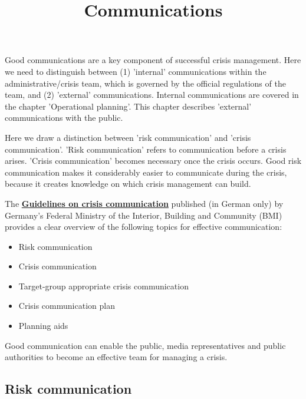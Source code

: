 \documentclass{article}
\begin{document}
\title{Communications}

\maketitle


Good communications are a key component of successful crisis management. Here we need to distinguish between (1) 'internal' communications within the administrative/crisis team, which is governed by the official regulations of the team, and (2) 'external' communications. Internal communications are covered in the chapter 'Operational planning'. This chapter describes 'external' communications with the public.


Here we draw a distinction between 'risk communication' and 'crisis communication'. 'Risk communication' refers to communication before a crisis arises. 'Crisis communication' becomes necessary once the crisis occurs. Good risk communication makes it considerably easier to communicate during the crisis, because it creates knowledge on which crisis management can build.


The \textbf{\href{https://www.bmi.bund.de/SharedDocs/downloads/DE/publikationen/themen/bevoelkerungsschutz/leitfaden-krisenkommunikation.pdf}{Guidelines on crisis communication}} published (in German only) by Germany's Federal Ministry of the Interior, Building and Community (BMI) provides a clear overview of the following topics for effective communication:

\begin{itemize}
\item Risk communication


\item Crisis communication


\item Target-group appropriate crisis communication


\item Crisis communication plan


\item Planning aids


\end{itemize}

Good communication can enable the public, media representatives and public authorities to become an effective team for managing a crisis.


\subsection{Risk communication}\label{H9313720}
\end{document}
